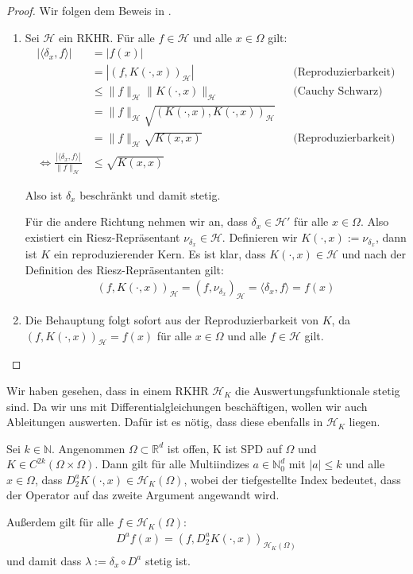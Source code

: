 \begin{proof}
Wir folgen dem Beweis in \textcite[Proposition 3.8]{Santin.2017}.
\begin{enumerate}
\item 
Sei $\mathcal{H}$ ein \ac{RKHR}. Für alle $f \in \mathcal{H}$ und alle $x \in \Omega$ gilt:
\begin{align*}
|\langle \delta_x,f \rangle | &= |f(x)|\\ 
&= |(f, K(\cdot,x))_\mathcal{H}| &&\text{(Reproduzierbarkeit)}\\
&\le \|f\|_\mathcal{H}\|K(\cdot,x)\|_\mathcal{H} &&\text{(Cauchy Schwarz)}\\
&= \|f\|_\mathcal{H} \sqrt{(K(\cdot,x),K(\cdot,x))_\mathcal{H}}\\
&= \|f\|_\mathcal{H} \sqrt{K(x,x)} &&\text{(Reproduzierbarkeit)}\\
\Leftrightarrow \frac{|\langle \delta_x,f \rangle|}{\|f\|_\mathcal{H}} &\le \sqrt{K(x,x)}
\end{align*}

Also ist $\delta_x$ beschränkt und damit stetig.

Für die andere Richtung nehmen wir an, dass $\delta_x  \in \mathcal{H}'$ für alle $x \in \Omega$. Also existiert ein Riesz-Repräsentant $\nu_{\delta_x} \in \mathcal{H}$. Definieren wir $K(\cdot,x):= \nu_{\delta_x}$, dann ist $K$ ein reproduzierender Kern. Es ist klar, dass $K(\cdot,x) \in \mathcal{H}$ und nach der Definition des Riesz-Repräsentanten gilt:
\begin{align*}
(f, K(\cdot,x))_\mathcal{H} = (f, \nu_{\delta_x})_\mathcal{H} = \langle \delta_x,f \rangle = f(x)
\end{align*}
\item Die Behauptung folgt sofort aus der Reproduzierbarkeit von $K$, da $(f, K(\cdot,x))_\mathcal{H}= f(x)$ für alle $x \in \Omega$ und alle $f \in \mathcal{H}$ gilt.
\end{enumerate}
\end{proof}

Wir haben gesehen, dass in einem \ac{RKHR} $\mathcal{H}_K$ die Auswertungsfunktionale stetig sind. Da wir uns mit Differentialgleichungen beschäftigen, wollen wir auch Ableitungen auswerten. Dafür ist es nötig, dass diese ebenfalls in $\mathcal{H}_K$ liegen.

\begin{theorem}
Sei $k \in \mathbb{N}$. Angenommen $\Omega \subset \mathbb{R}^d$ ist offen, K ist \ac{SPD} auf $\Omega$ und $K \in C^{2k}(\Omega \times \Omega)$. Dann gilt für alle Multiindizes $a \in \mathbb{N}_0^d$ mit $|a| \le k$ und alle $x \in \Omega$, dass $D_2^a K(\cdot , x) \in \mathcal{H}_K(\Omega)$, wobei der tiefgestellte Index bedeutet, dass der Operator auf das zweite Argument angewandt wird.

Außerdem gilt für alle $f \in \mathcal{H}_K(\Omega)$:
\begin{align*}
D^a f(x) = \left(f,D_2^a K(\cdot,x)\right)_{\mathcal{H}_K(\Omega)}
\end{align*}
und damit dass $\lambda := \delta_x \circ D^a$ stetig ist.
\end{theorem}

